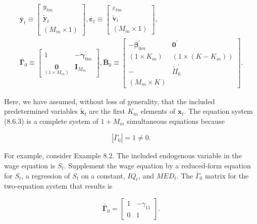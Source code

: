 \documentclass[10pt]{article}
\begin{document}
\begin{align*}
\overline{\mathbf{y}}_{t} \equiv\left[\begin{array}{c}
y_{t m} \\
\tilde{\mathbf{y}}_{t} \\
\left(M_{m} \times 1\right)
\end{array}\right], \overline{\boldsymbol{\varepsilon}}_{t} \equiv\left[\begin{array}{c}
\varepsilon_{t m} \\
\tilde{\mathbf{v}}_{t} \\
\left(M_{m} \times 1\right)
\end{array}\right], \\
\overline{\boldsymbol{\Gamma}}_{0} \equiv\left[\begin{array}{cc}
1 & -\boldsymbol{\gamma}_{0 m}^{\prime} \\
\underset{\left(1 \times M_{m}\right)}{\mathbf{0}} & \mathbf{I}_{M_{m}}
\end{array}\right], \overline{\mathbf{B}}_{0} \equiv\left[\begin{array}{cc}
-\boldsymbol{\beta}_{0 m}^{\prime} & \mathbf{0}^{\prime} \\
\left(1 \times K_{m}\right) & \left(1 \times\left(K-K_{m}\right)\right) \\
- & \tilde{\Pi}_{0}^{\prime} \\
\left(M_{m} \times K\right)
\end{array}\right] . \tag{8.6.4}
\end{align*}


Here, we have assumed, without loss of generality, that the included predetermined variables $\tilde{\mathbf{x}}_{t}$ are the first $K_{m}$ elements of $\mathbf{x}_{t}$. The equation system (8.6.3) is a complete system of $1+M_{m}$ simultaneous equations because


\begin{equation*}
\left|\bar{\Gamma}_{0}\right|=1 \neq 0 . \tag{8.6.5}
\end{equation*}


For example, consider Example 8.2. The included endogenous variable in the wage equation is $S_{t}$. Supplement the wage equation by a reduced-form equation for $S_{t}$, a regression of $S_{t}$ on a constant, $I Q_{t}$, and $M E D_{t}$. The $\bar{\Gamma}_{0}$ matrix for the two-equation system that results is

$$
\overline{\boldsymbol{\Gamma}}_{0}=\left[\begin{array}{cc}
1 & -\gamma_{11} \\
0 & 1
\end{array}\right] .
$$
\end{document}
